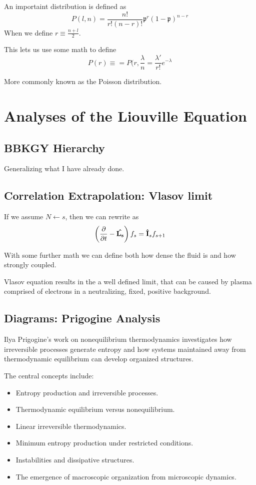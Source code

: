 An importaint distribution is defined as
\[
P(l,n) = \frac{n !}{r!(n-r)!}\mathfrak{p}^r(1- \mathfrak{p})^{n-r}
  \]
  When we define $r \equiv \frac{n+l}{2}$.

This lets us use some math to define
\[
    P(r) \equiv = P(r, \frac{\lambda}{n} = \frac{\lambda '}{r!}e^{-\lambda}  \]

More commonly known as the Poisson distribution.

\section{Analyses of the Liouville Equation}

\subsection{BBKGY Hierarchy}

Generalizing what I have already done.

\subsection{Correlation Extrapolation: Vlasov limit}
If we assume $N \gets s$, then we can rewrite as
\[
\left(\pdv{}{t} - \vu{L_s}  \right)f_s = \vu{I}_s f_{s+1}
  \]

  With some further math we can define both how dense the fluid is and how strongly coupled.

  Vlasov equation results in the a well defined limit, that can be caused by plasma comprised of electrons in a neutralizing, fixed, positive background.

\subsection{Diagrams: Prigogine Analysis}
Ilya Prigogine's work on nonequilibrium thermodynamics
investigates how irreversible processes generate entropy
and how systems maintained away from thermodynamic
equilibrium can develop organized structures.

The central concepts include:
\begin{itemize}
    \item Entropy production and irreversible processes.
    \item Thermodynamic equilibrium versus nonequilibrium.
    \item Linear irreversible thermodynamics.
    \item Minimum entropy production under restricted conditions.
    \item Instabilities and dissipative structures.
    \item The emergence of macroscopic organization from
          microscopic dynamics.
\end{itemize}

